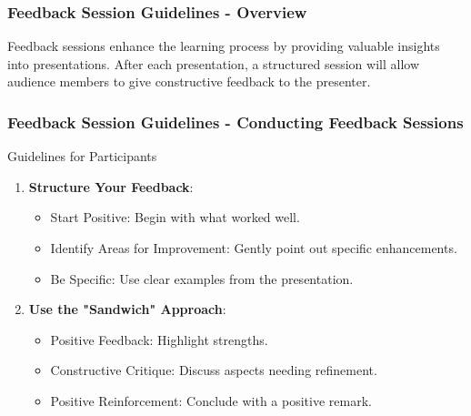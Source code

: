 \documentclass[aspectratio=169]{beamer}
\begin{document}
\begin{frame}[fragile]
    \frametitle{Feedback Session Guidelines - Overview}
    Feedback sessions enhance the learning process by providing valuable insights into presentations. 
    After each presentation, a structured session will allow audience members to give constructive feedback to the presenter.
\end{frame}

\begin{frame}[fragile]
    \frametitle{Feedback Session Guidelines - Conducting Feedback Sessions}
    \begin{block}{Guidelines for Participants}
        \begin{enumerate}
            \item \textbf{Structure Your Feedback}:
            \begin{itemize}
                \item Start Positive: Begin with what worked well.
                \item Identify Areas for Improvement: Gently point out specific enhancements.
                \item Be Specific: Use clear examples from the presentation.
            \end{itemize}
            \item \textbf{Use the "Sandwich" Approach}:
            \begin{itemize}
                \item Positive Feedback: Highlight strengths.
                \item Constructive Critique: Discuss aspects needing refinement.
                \item Positive Reinforcement: Conclude with a positive remark.
            \end{itemize}
        \end{enumerate}
    \end{block}
\end{frame}
\end{document}
